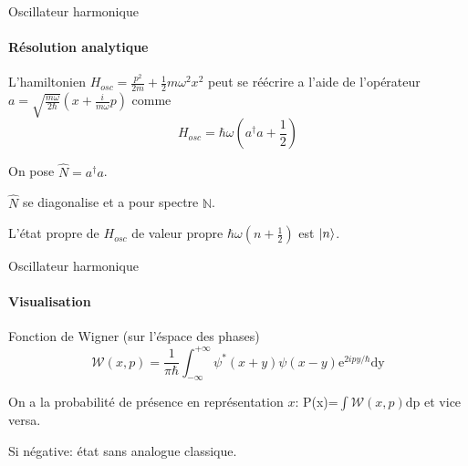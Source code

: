 \documentclass[11pt]{beamer}
\begin{document}
\begin{frame}{Oscillateur harmonique}
\framesubtitle{Résolution analytique}
L'hamiltonien $H_{osc}=\frac{p^2}{2m}+\frac 12 m\omega^2x^2$ peut se réécrire a l'aide de l'opérateur $\displaystyle a=\sqrt{\frac{m\omega}{2\hbar}}\left(x+\frac{i}{m\omega}p\right)$ comme 
\[
H_{osc}=\hbar\omega\left(a^{\dag}a+\frac 12\right)
\]

On pose $\hat{N}=a^{\dag}a$.

$\hat{N}$ se diagonalise et a pour spectre $\mathbb{N}$.

L'état propre de $H_{osc}$ de valeur propre $\hbar\omega(n+\frac 12)$ est $\ket{n}$.
\end{frame}

\begin{frame}{Oscillateur harmonique}
\framesubtitle{Visualisation}
\begin{block}{Fonction de Wigner (sur l'éspace des phases)}
\[
\mathcal{W}(x,p)=\frac{1}{\pi\hbar}\int_{-\infty}^{+\infty}\psi^*(x+y)\psi(x-y)\textrm{e}^{2ipy/\hbar}\textrm{dy}
\]
\end{block}

On a la probabilité de présence en représentation $x$: P(x)=$\int\mathcal{W}(x,p)\textrm{dp}$ et vice versa.

Si négative: état sans analogue classique.
\end{frame}
\end{document}

